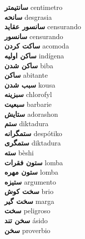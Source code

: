 \textbf{ سانتیمتر  } centimetro \\
\textbf{ سانحه  } desgrasia \\
\textbf{ سانسور عقاید  } censurando \\
\textbf{ سانسور  } censurando \\
\textbf{ ساکت کردن  } acomoda \\
\textbf{ ساکن اولیه  } indígena \\
\textbf{ ساکن شدن  } biba \\
\textbf{ ساکن  } abitante \\
\textbf{ سبب شدن  } kousa \\
\textbf{ سبزینه  } chlorofyl \\
\textbf{ سبعیت  } barbarie \\
\textbf{ ستایش  } adorashon \\
\textbf{ ستم  } diktadura \\
\textbf{ ستمگرانه  } despótiko \\
\textbf{ ستمگری  } diktadura \\
\textbf{ سته  } bèshi \\
\textbf{ ستون فقرات  } lomba \\
\textbf{ ستون مهره  } lomba \\
\textbf{ ستیزه  } argumento \\
\textbf{ سخت کوش  } brio \\
\textbf{ سخت گیر  } marga \\
\textbf{ سخت  } peligroso \\
\textbf{ سخن تند  } ásido \\
\textbf{ سخن  } proverbio \\
